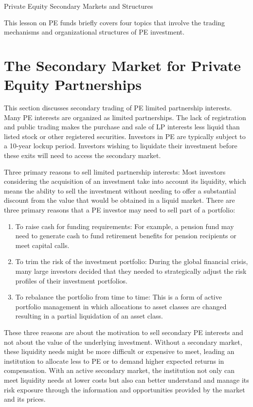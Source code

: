 \documentclass[11pt]{article}
\begin{document}
Private Equity Secondary Markets and Structures

This lesson on PE funds briefly covers four topics that involve the trading mechanisms and organizational structures of PE investment.

\section*{The Secondary Market for Private Equity Partnerships}
This section discusses secondary trading of PE limited partnership interests. Many PE interests are organized as limited partnerships. The lack of registration and public trading makes the purchase and sale of LP interests less liquid than listed stock or other registered securities. Investors in PE are typically subject to a 10-year lockup period. Investors wishing to liquidate their investment before these exits will need to access the secondary market.

Three primary reasons to sell limited partnership interests: Most investors considering the acquisition of an investment take into account its liquidity, which means the ability to sell the investment without needing to offer a substantial discount from the value that would be obtained in a liquid market. There are three primary reasons that a PE investor may need to sell part of a portfolio:

\begin{enumerate}
  \item To raise cash for funding requirements: For example, a pension fund may need to generate cash to fund retirement benefits for pension recipients or meet capital calls.

  \item To trim the risk of the investment portfolio: During the global financial crisis, many large investors decided that they needed to strategically adjust the risk profiles of their investment portfolios.

  \item To rebalance the portfolio from time to time: This is a form of active portfolio management in which allocations to asset classes are changed resulting in a partial liquidation of an asset class.

\end{enumerate}

These three reasons are about the motivation to sell secondary PE interests and not about the value of the underlying investment. Without a secondary market, these liquidity needs might be more difficult or expensive to meet, leading an institution to allocate less to PE or to demand higher expected returns in compensation. With an active secondary market, the institution not only can meet liquidity needs at lower costs but also can better understand and manage its risk exposure through the information and opportunities provided by the market and its prices.
\end{document}
